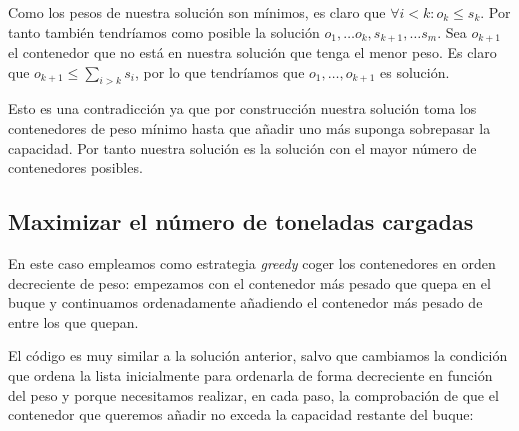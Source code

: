 Como los pesos de nuestra solución son mínimos, es claro que $\forall i < k: o_k \leq s_k$.
Por tanto también tendríamos como posible la solución $o_1, \dots o_k, s_{k+1}, \dots s_m$.
Sea $o_{k+1}$ el contenedor que no está en nuestra solución que tenga el menor peso.
Es claro que $o_{k+1} \leq \sum_{i > k} s_i$, por lo que tendríamos que
$o_1, \dots, o_{k+1}$ es solución.

Esto es una contradicción ya que por construcción nuestra solución toma los contenedores
de peso mínimo hasta que añadir uno más suponga sobrepasar la capacidad. Por tanto nuestra
solución es la solución con el mayor número de contenedores posibles.

\subsection{Maximizar el número de toneladas cargadas}

En este caso empleamos como estrategia \textit{greedy} coger los contenedores en orden
decreciente de peso: empezamos con el contenedor más pesado que quepa en el buque
y continuamos ordenadamente añadiendo el contenedor más pesado de entre los que quepan.

El código es muy similar a la solución anterior, salvo que cambiamos la condición
que ordena la lista inicialmente para ordenarla de forma decreciente en función del peso
y porque necesitamos realizar, en cada paso, la comprobación de que el contenedor que
queremos añadir no exceda la capacidad restante del buque:




